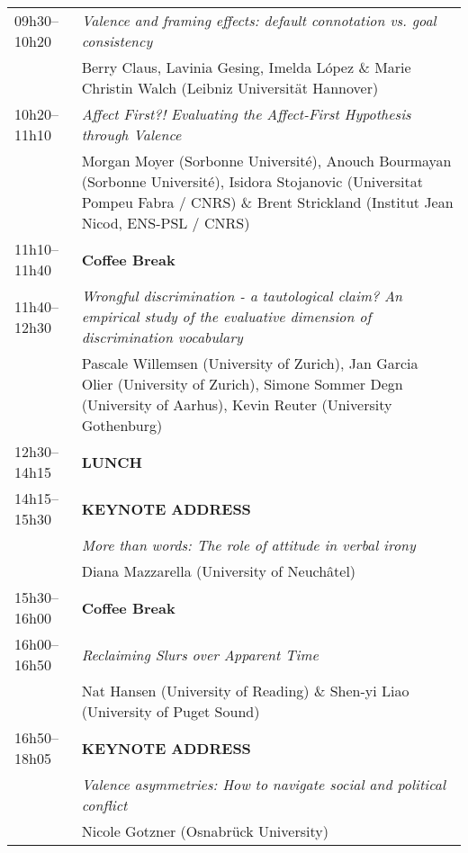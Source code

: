 \documentclass[a4paper,12pt]{article}
\begin{document}
\begin{center}
\begin{tabularx}{\textwidth}{>{\raggedright\arraybackslash}p{3cm} X}
\hline
09h30--10h20 & \textit{Valence and framing effects: default connotation vs. goal consistency} \\
            & Berry Claus, Lavinia Gesing, Imelda López \& Marie Christin Walch (Leibniz Universität Hannover) \\
\hline
10h20--11h10 & \textit{Affect First?! Evaluating the Affect-First Hypothesis through Valence} \\
             & Morgan Moyer (Sorbonne Université), Anouch Bourmayan (Sorbonne Université), Isidora Stojanovic (Universitat Pompeu Fabra / CNRS) \& Brent Strickland (Institut Jean Nicod, ENS-PSL / CNRS) \\
\hline
11h10--11h40 & \textbf{Coffee Break} \\
\hline
11h40--12h30 & \textit{Wrongful discrimination - a tautological claim? An empirical study of the evaluative dimension of discrimination vocabulary} \\
             & Pascale Willemsen (University of Zurich), Jan Garcia Olier (University of Zurich), Simone Sommer Degn (University of Aarhus), Kevin Reuter (University Gothenburg) \\
\hline
12h30--14h15 & \textbf{LUNCH} \\
\hline
14h15--15h30 & \textbf{KEYNOTE ADDRESS} \\
             & \textit{More than words: The role of attitude in verbal irony} \\
             & Diana Mazzarella (University of Neuchâtel) \\
\hline
15h30--16h00 & \textbf{Coffee Break} \\
\hline
16h00--16h50 & \textit{Reclaiming Slurs over Apparent Time} \\
             & Nat Hansen (University of Reading) \& Shen-yi Liao (University of Puget Sound) \\
\hline
16h50--18h05 & \textbf{KEYNOTE ADDRESS} \\
             & \textit{Valence asymmetries: How to navigate social and political conflict} \\
             & Nicole Gotzner (Osnabrück University) \\
\hline 
\end{tabularx}
\end{center}
\end{document}
